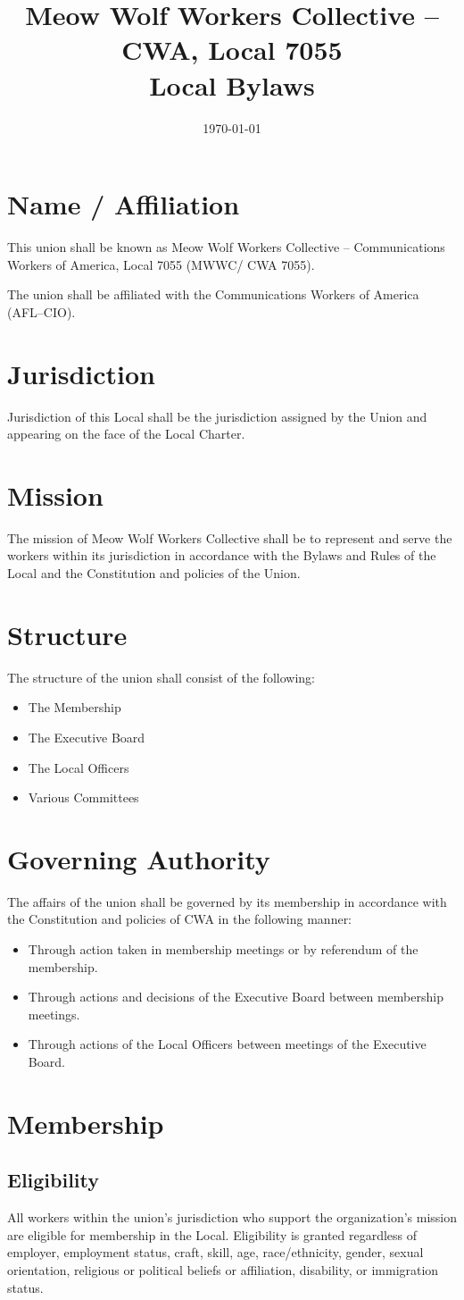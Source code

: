 \documentclass[11pt]{article}
\title{Meow Wolf Workers Collective \--- CWA, Local 7055 \\ Local Bylaws}
\date{\today}
\newcommand{\article}[1]{\vspace{.75cm}\section{#1}}
\newcommand{\articlesection}[1]{\vspace{.25cm}\subsection{#1}}
\begin{document}
\maketitle

\tableofcontents
{}
\newpage

\article{Name / Affiliation}
This union shall be known as Meow Wolf Workers Collective – Communications Workers of America, Local 7055 (MWWC/ CWA 7055).

The union shall be affiliated with the Communications Workers of America (AFL–CIO).

\article{Jurisdiction}
Jurisdiction of this Local shall be the jurisdiction assigned by the Union and appearing on the face of the Local Charter.

\article{Mission}
The mission of Meow Wolf Workers Collective shall be to represent and serve the workers within its jurisdiction in accordance with the Bylaws and Rules of the Local and the Constitution and policies of the Union.

\article{Structure}
The structure of the union shall consist of the following:

\begin{itemize}
\item The Membership
\item The Executive Board
\item The Local Officers
\item Various Committees
\end{itemize}

\article{Governing Authority}

The affairs of the union shall be governed by its membership in accordance with the Constitution and policies of CWA in the following manner:

\begin{itemize}
\item Through action taken in membership meetings or by referendum of the membership.
\item Through actions and decisions of the Executive Board between membership meetings.
\item Through actions of the Local Officers between meetings of the Executive Board.
\end{itemize}

\article{Membership}\label{membership}
\articlesection{Eligibility}
All workers within the union’s jurisdiction who support the organization’s mission are eligible for membership in the Local. Eligibility is granted regardless of employer, employment status, craft, skill, age, race/ethnicity, gender, sexual orientation, religious or political beliefs or affiliation, disability, or immigration status.
\end{document}
